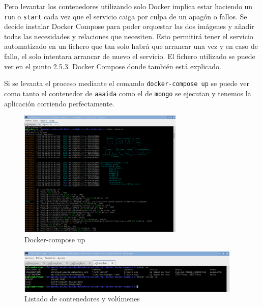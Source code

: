 Pero levantar los contenedores utilizando solo Docker implica estar haciendo un \texttt{run} o \texttt{start} cada vez que el servicio caiga por culpa de un apagón o fallos. Se decide instalar Docker Compose para poder orquestar las dos imágenes y añadir todas las necesidades y relaciones que necesiten. Esto permitirá tener el servicio automatizado en un fichero que tan solo habrá que arrancar una vez y en caso de fallo, el solo intentara arrancar de nuevo el servicio. El fichero utilizado se puede ver en el punto 2.5.3. Docker Compose donde también está explicado. 

Si se levanta el proceso mediante el comando \texttt{docker-compose up} se puede ver como tanto el contenedor de \texttt{aaaida} como el de \texttt{mongo} se ejecutan y tenemos la aplicación corriendo perfectamente.

\begin{figure}[htb]
\begin{center}
\includegraphics[width=0.70\textwidth]{./setup/dockerComposeUp}
\caption{Docker-compose up}
\label{ComUp:composeUp}
\end{center}
\end{figure} 
\pagebreak
\begin{figure}[htb]
\begin{center}
\includegraphics[width=0.95\textwidth]{./setup/dockerpsVolumen}
\caption{Listado de contenedores y volúmenes}
\label{psVl:psVolumen}
\end{center}
\end{figure} 


